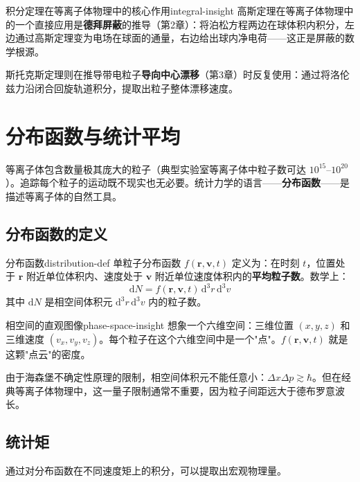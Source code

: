 \documentclass[12pt,a4paper,openany,oneside]{book}
\newcommand{\diff}{\mathrm{d}}
\newcommand{\vect}[1]{\bm{#1}}
\newcommand{\difficulty}[1]{\marginnote{\textcolor{red}{\textbf{[#1]}}}}
\begin{document}
\begin{insight}{积分定理在等离子体物理中的核心作用}{integral-insight}
高斯定理在等离子体物理中的一个直接应用是\textbf{德拜屏蔽}的推导（第2章）：将泊松方程两边在球体积内积分，左边通过高斯定理变为电场在球面的通量，右边给出球内净电荷——这正是屏蔽的数学根源。

斯托克斯定理则在推导带电粒子\textbf{导向中心漂移}（第3章）时反复使用：通过将洛伦兹力沿闭合回旋轨道积分，提取出粒子整体漂移速度。
\end{insight}

\section{分布函数与统计平均}\difficulty{基础}

等离子体包含数量极其庞大的粒子（典型实验室等离子体中粒子数可达 $10^{15}$--$10^{20}$）。追踪每个粒子的运动既不现实也无必要。统计力学的语言——\textbf{分布函数}——是描述等离子体的自然工具。

\subsection{分布函数的定义}

\begin{definition}{分布函数}{distribution-def}
单粒子分布函数 $f(\vect{r},\vect{v},t)$ 定义为：在时刻 $t$，位置处于 $\vect{r}$ 附近单位体积内、速度处于 $\vect{v}$ 附近单位速度体积内的\textbf{平均粒子数}。数学上：
\[
\diff N = f(\vect{r},\vect{v},t)\,\diff^3r\,\diff^3v
\]
其中 $\diff N$ 是相空间体积元 $\diff^3r\,\diff^3v$ 内的粒子数。
\end{definition}

\begin{insight}{相空间的直观图像}{phase-space-insight}
想象一个六维空间：三维位置 $(x,y,z)$ 和三维速度 $(v_x,v_y,v_z)$。每个粒子在这个六维空间中是一个"点"。$f(\vect{r},\vect{v},t)$ 就是这颗"点云"的密度。

由于海森堡不确定性原理的限制，相空间体积元不能任意小：$\Delta x\Delta p \gtrsim \hbar$。但在经典等离子体物理中，这一量子限制通常不重要，因为粒子间距远大于德布罗意波长。
\end{insight}

\subsection{统计矩}

通过对分布函数在不同速度矩上的积分，可以提取出宏观物理量。
\end{document}
